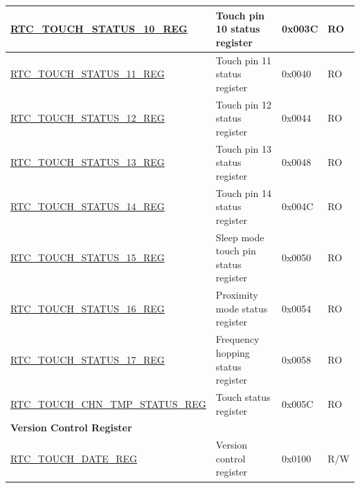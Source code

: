 \begin{longtable}{ | l | p{7.2cm} | p{1.3cm} | p{1.7cm} | }
\hyperref[regdesc:RTCTOUCHSTATUS0REG]{RTC\_TOUCH\_STATUS\_10\_REG} & Touch pin 10 status register & 0x003C & RO \\ \hline
\hyperref[regdesc:RTCTOUCHSTATUS0REG]{RTC\_TOUCH\_STATUS\_11\_REG} & Touch pin 11 status register & 0x0040 & RO \\ \hline
\hyperref[regdesc:RTCTOUCHSTATUS0REG]{RTC\_TOUCH\_STATUS\_12\_REG} & Touch pin 12 status register & 0x0044 & RO \\ \hline
\hyperref[regdesc:RTCTOUCHSTATUS0REG]{RTC\_TOUCH\_STATUS\_13\_REG} & Touch pin 13 status register & 0x0048 & RO \\ \hline
\hyperref[regdesc:RTCTOUCHSTATUS0REG]{RTC\_TOUCH\_STATUS\_14\_REG} & Touch pin 14 status register & 0x004C & RO \\ \hline
\hyperref[regdesc:RTCTOUCHSTATUS15REG]{RTC\_TOUCH\_STATUS\_15\_REG} & Sleep mode touch pin status register & 0x0050 & RO \\ \hline
\hyperref[regdesc:RTCTOUCHSTATUS16REG]{RTC\_TOUCH\_STATUS\_16\_REG} & Proximity mode status register & 0x0054 & RO \\ \hline
\hyperref[regdesc:RTCTOUCHSTATUS17REG]{RTC\_TOUCH\_STATUS\_17\_REG} & Frequency hopping status register & 0x0058 & RO \\ \hline
\hyperref[regdesc:RTCTOUCHCHNTMPSTATUSREG]{RTC\_TOUCH\_CHN\_TMP\_STATUS\_REG} & Touch status register & 0x005C & RO \\ \hline
\multicolumn{4}{|l|}{\textbf{Version Control Register}} \\ \hline
\hyperref[regdesc:RTCTOUCHDATEREG]{RTC\_TOUCH\_DATE\_REG} & Version control register & 0x0100 & R/W \\ \hline
\end{longtable}
